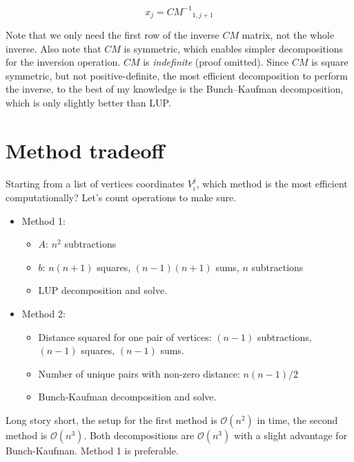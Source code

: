 \begin{equation} \label{cm-coords}
x_j = {CM^{-1}}_{1,j+1}
\end{equation}

Note that we only need the first row of the inverse $CM$ matrix, not the whole
inverse. Also note that $CM$ is symmetric, which enables simpler decompositions
for the inversion operation. $CM$ is \emph{indefinite} (proof omitted).
Since $CM$ is square symmetric, but not positive-definite, the most efficient
decomposition to perform the inverse, to the best of my knowledge is the
Bunch–Kaufman decomposition, which is only slightly better than LUP.

\section{Method tradeoff}
Starting from a list of vertices coordinates $V_i^j$, which method is the most
efficient computationally? Let's count operations to make sure.

\begin{itemize}
\item Method 1: \begin{itemize}
\item $A$: $n^2$ subtractions
\item $b$: $n(n+1)$ squares, $(n-1)(n+1)$ sums, $n$ subtractions
\item LUP decomposition and solve.
\end{itemize}
\item Method 2: \begin{itemize}
\item Distance squared for one pair of vertices: $(n-1)$ subtractions, $(n-1)$
      squares, $(n-1)$ sums.
\item Number of unique pairs with non-zero distance: $n(n-1)/2$
\item Bunch-Kaufman decomposition and solve.
\end{itemize} \end{itemize}

Long story short, the setup for the first method is $\mathcal{O}(n^2)$ in time,
the second method is $\mathcal{O}(n^3)$. Both decompositions are
$\mathcal{O}(n^3)$ with a slight advantage for Bunch-Kaufman. Method 1 is
preferable.
